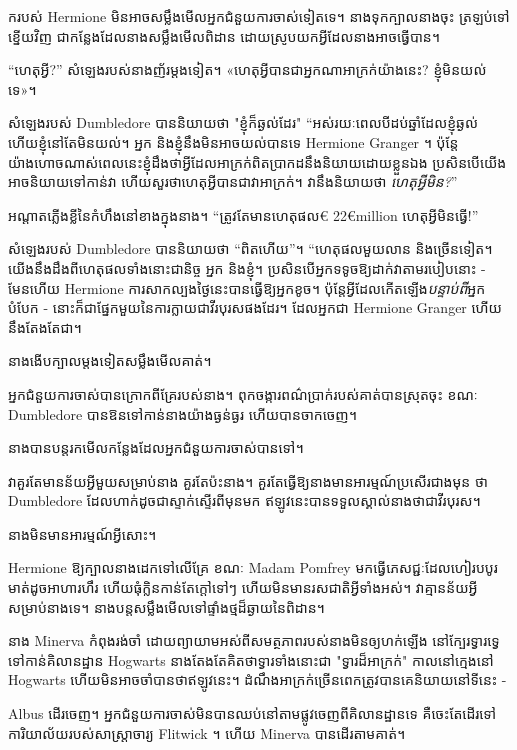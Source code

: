 ករបស់ Hermione មិនអាចសម្លឹងមើលអ្នកជំនួយការចាស់ទៀតទេ។ នាង​ទុក​ក្បាល​នាង​ចុះ ត្រឡប់​ទៅ​ខ្នើយ​វិញ ជា​កន្លែង​ដែល​នាង​សម្លឹង​មើល​ពិដាន ដោយ​ស្រូប​យក​អ្វី​ដែល​នាង​អាច​ធ្វើ​បាន។

“ហេតុអ្វី?” សំឡេងរបស់នាងញ័រម្តងទៀត។ «ហេតុ​អ្វី​បាន​ជា​អ្នក​ណា​អាក្រក់​យ៉ាង​នេះ? ខ្ញុំ​មិន​យល់​ទេ»។

សំឡេងរបស់ Dumbledore បាននិយាយថា "ខ្ញុំក៏ឆ្ងល់ដែរ" “អស់រយៈពេលបីដប់ឆ្នាំដែលខ្ញុំឆ្ងល់ ហើយខ្ញុំនៅតែមិនយល់។ អ្នក និងខ្ញុំនឹងមិនអាចយល់បានទេ Hermione Granger ។ ប៉ុន្តែ យ៉ាងហោចណាស់ពេលនេះខ្ញុំដឹងថាអ្វីដែលអាក្រក់ពិតប្រាកដនឹងនិយាយដោយខ្លួនឯង ប្រសិនបើយើងអាចនិយាយទៅកាន់វា ហើយសួរថាហេតុអ្វីបានជាវាអាក្រក់។ វានឹងនិយាយថា \emph{ហេតុអ្វីមិន?}”

អណ្តាតភ្លើងខ្លីនៃកំហឹងនៅខាងក្នុងនាង។ “ត្រូវតែមានហេតុផល€ 22€{million} ហេតុអ្វីមិនធ្វើ!”

សំឡេង​របស់ Dumbledore បាន​និយាយ​ថា “ពិត​ហើយ”។ “ហេតុផលមួយលាន និងច្រើនទៀត។ យើងនឹងដឹងពីហេតុផលទាំងនោះជានិច្ច អ្នក និងខ្ញុំ\@។ ប្រសិនបើអ្នកទទូចឱ្យដាក់វាតាមរបៀបនោះ - មែនហើយ Hermione ការសាកល្បងថ្ងៃនេះបានធ្វើឱ្យអ្នកខូច។ ប៉ុន្តែអ្វីដែលកើតឡើង\emph{បន្ទាប់ពី}អ្នកបំបែក - នោះក៏ជាផ្នែកមួយនៃការក្លាយជាវីរបុរសផងដែរ។ ដែលអ្នកជា Hermione Granger ហើយនឹងតែងតែជា។

នាងងើបក្បាលម្តងទៀតសម្លឹងមើលគាត់។

អ្នកជំនួយការចាស់បានក្រោកពីគ្រែរបស់នាង។ ពុកចង្ការ​ពណ៌​ប្រាក់​របស់​គាត់​បាន​ស្រុត​ចុះ ខណៈ Dumbledore បាន​ឱន​ទៅ​កាន់​នាង​យ៉ាង​ធ្ងន់ធ្ងរ ហើយ​បាន​ចាកចេញ។

នាងបានបន្តរកមើលកន្លែងដែលអ្នកជំនួយការចាស់បានទៅ។

វាគួរតែមានន័យអ្វីមួយសម្រាប់នាង គួរតែប៉ះនាង។ គួរតែធ្វើឱ្យនាងមានអារម្មណ៍ប្រសើរជាងមុន ថា Dumbledore ដែលហាក់ដូចជាស្ទាក់ស្ទើរពីមុនមក ឥឡូវនេះបានទទួលស្គាល់នាងថាជាវីរបុរស។

នាងមិនមានអារម្មណ៍អ្វីសោះ។

Hermione ឱ្យ​ក្បាល​នាង​ដេក​ទៅ​លើ​គ្រែ ខណៈ​ Madam Pomfrey មក​ធ្វើ​ភេសជ្ជៈ​ដែល​ហៀរ​បបូរមាត់​ដូច​អាហារ​ហឹរ ហើយ​ធុំ​ក្លិន​កាន់តែ​ក្តៅ​ទៅៗ ហើយ​មិន​មាន​រសជាតិ​អ្វី​ទាំងអស់​។ វាគ្មានន័យអ្វីសម្រាប់នាងទេ។ នាងបន្តសម្លឹងមើលទៅផ្ទាំងថ្មដ៏ឆ្ងាយនៃពិដាន។

\later

នាង Minerva កំពុងរង់ចាំ ដោយព្យាយាមអស់ពីសមត្ថភាពរបស់នាងមិនឲ្យហក់ឡើង នៅក្បែរទ្វារទ្វេទៅកាន់គិលានដ្ឋាន Hogwarts នាងតែងតែគិតថាទ្វារទាំងនោះជា "ទ្វារដ៏អាក្រក់" កាលនៅក្មេងនៅ Hogwarts ហើយមិនអាចចាំបានថាឥឡូវនេះ។ ដំណឹងអាក្រក់ច្រើនពេកត្រូវបានគេនិយាយនៅទីនេះ -

Albus ដើរចេញ។ អ្នកជំនួយការចាស់មិនបានឈប់នៅតាមផ្លូវចេញពីគិលានដ្ឋានទេ គឺចេះតែដើរទៅការិយាល័យរបស់សាស្រ្តាចារ្យ Flitwick ។ ហើយ Minerva បានដើរតាមគាត់។

